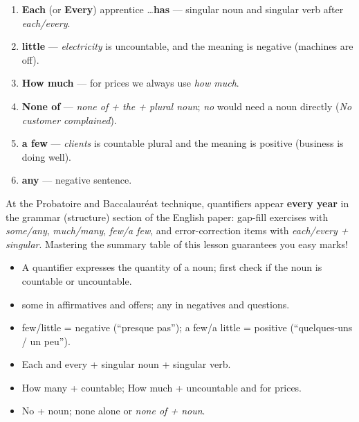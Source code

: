 \documentclass[11pt]{article}
\newcommand{\cle}[1]{{\popxbold\color{popdark}#1}}
\begin{document}
\begin{corrige}
\begin{enumerate}
\item \textbf{Each} (or \textbf{Every}) apprentice \ldots \textbf{has} — singular noun and singular verb after \emph{each/every}.
\item \textbf{little} — \emph{electricity} is uncountable, and the meaning is negative (machines are off).
\item \textbf{How much} — for prices we always use \emph{how much}.
\item \textbf{None of} — \emph{none of + the + plural noun}; \emph{no} would need a noun directly (\emph{No customer complained}).
\item \textbf{a few} — \emph{clients} is countable plural and the meaning is positive (business is doing well).
\item \textbf{any} — negative sentence.
\end{enumerate}
\end{corrige}

\begin{savaistu}
At the Probatoire and Baccalauréat technique, quantifiers appear \textbf{every year} in the grammar (structure) section of the English paper: gap-fill exercises with \emph{some/any}, \emph{much/many}, \emph{few/a few}, and error-correction items with \emph{each/every + singular}. Mastering the summary table of this lesson guarantees you easy marks!
\end{savaistu}

\begin{aretenir}
\begin{itemize}
\item A \cle{quantifier} expresses the quantity of a noun; first check if the noun is countable or uncountable.
\item \cle{some} in affirmatives and offers; \cle{any} in negatives and questions.
\item \cle{few/little} = negative (``presque pas''); \cle{a few/a little} = positive (``quelques-uns / un peu'').
\item \cle{Each} and \cle{every} + singular noun + singular verb.
\item \cle{How many} + countable; \cle{How much} + uncountable and for prices.
\item \cle{No} + noun; \cle{none} alone or \emph{none of + noun}.
\end{itemize}
\end{aretenir}
\end{document}
